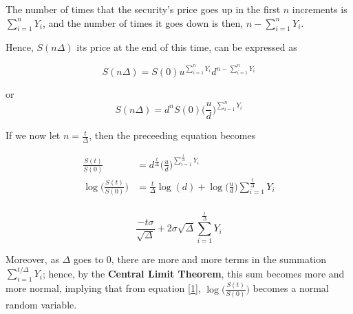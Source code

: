 \documentclass[12pt]{article}
\begin{document}
The number of times that the security's price goes up in the first $n$ increments is \(\sum_{i=1}^{n} Y_i \), and the number of times it goes down is then, \(n - \sum_{i=1}^{n} Y_i\).

Hence, $S(n\Delta)$ its price at the end of this time, can be expressed as 

\[ 
S(n \Delta) = S(0) u^{\sum_{i=1}^{n}Y_i} d^{n - \sum_{i=1}^{n} Y_i}
\]

or 
\[
S(n \Delta) = d^{n} S(0) \biggl( \frac{u}{d} \biggr)^{\sum_{i=1}^{n} Y_i}
\]

If we now let \( n = \frac{t}{\Delta} \), then the preceeding equation becomes 

\begin{align*}
    \frac{S(t)}{S(0)} &= d^{\frac{t}{\Delta}} \biggl( \frac{u}{d} \biggr)^{\sum_{i=1}^{\frac{t}{\Delta}} Y_i} \\
\log \biggl( \frac{S(t)}{S(0)} \biggr) &= \frac{t}{\Delta} \log{(d)} + \log{\biggl(\frac{u}{d}\biggr)} \sum_{i=1}^{\frac{t}{\Delta}} Y_i \\
\end{align*}

\begin{equation}\label{1}
    \frac{-t\sigma}{\sqrt{\Delta}} + 2 \sigma \sqrt{\Delta} \sum_{i=1}^{\frac{t}{\Delta}} Y_i
\end{equation}

Moreover, as $\Delta$ goes to 0, there are more and more terms in the summation $\sum_{i=1}^{t / \Delta} Y_i$; hence, by the \textbf{Central Limit Theorem}, this sum becomes more and more normal, implying that from equation \eqref{1}, $\log \biggl(\frac{S(t)}{S(0)}\biggr)$ becomes a normal random variable.
\end{document}
